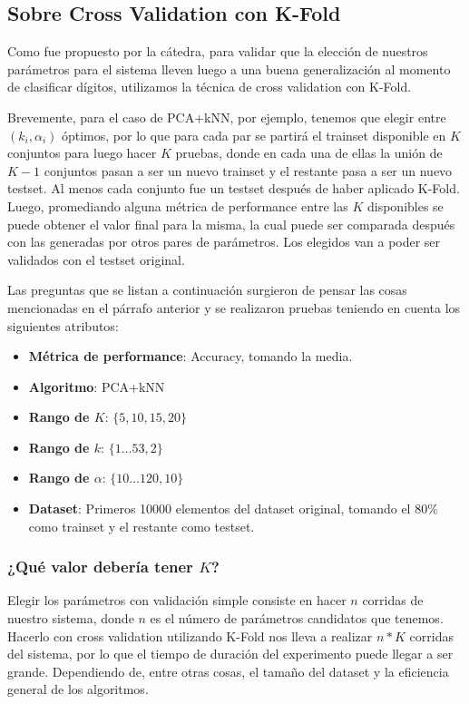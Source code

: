 \subsection{Sobre Cross Validation con K-Fold}

Como fue propuesto por la cátedra, para validar que la elección de nuestros parámetros para el sistema lleven luego a una buena generalización al momento de clasificar dígitos, utilizamos la técnica de cross validation con K-Fold.

Brevemente, para el caso de PCA+kNN, por ejemplo, tenemos que elegir entre $(k_i, \alpha_i)$ óptimos, por lo que para cada par se partirá el trainset disponible en $K$ conjuntos para luego hacer $K$ pruebas, donde en cada una de ellas la unión de $K-1$ conjuntos pasan a ser un nuevo trainset y el restante pasa a ser un nuevo testset. Al menos cada conjunto fue un testset después de haber aplicado K-Fold. Luego, promediando alguna métrica de performance entre las $K$ disponibles se puede obtener el valor final para la misma, la cual puede ser comparada después con las generadas por otros pares de parámetros. Los elegidos van a poder ser validados con el testset original.

Las preguntas que se listan a continuación surgieron de pensar las cosas mencionadas en el párrafo anterior y se realizaron pruebas teniendo en cuenta los siguientes atributos:

\begin{itemize}
    \item \textbf{Métrica de performance}: Accuracy, tomando la media.
    \item \textbf{Algoritmo}: PCA+kNN
    \item \textbf{Rango de $K$}: $\{5, 10, 15, 20\}$
    \item \textbf{Rango de $k$}: $\{1\dots53, 2\}$
    \item \textbf{Rango de $\alpha$}: $\{10\dots120, 10\}$
    \item \textbf{Dataset}: Primeros 10000 elementos del dataset original, tomando el $80\%$ como trainset y el restante como testset.
\end{itemize}

\subsubsection{¿Qué valor debería tener $K$?}\label{KFoldValueK}

Elegir los parámetros con validación simple consiste en hacer $n$ corridas de nuestro sistema, donde $n$ es el número de parámetros candidatos que tenemos. Hacerlo con cross validation utilizando K-Fold nos lleva a realizar $n * K$ corridas del sistema, por lo que el tiempo de duración del experimento puede llegar a ser grande. Dependiendo de, entre otras cosas, el tamaño del dataset y la eficiencia general de los algoritmos.

